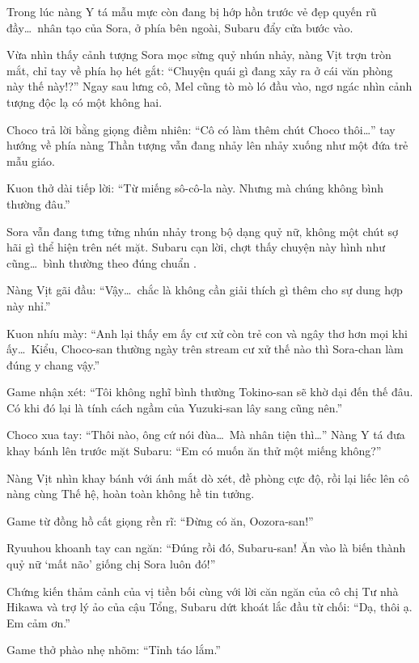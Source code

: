 \documentclass[../main.tex]{subfiles}
\begin{document}
Trong lúc nàng Y tá mẫu mực còn đang bị hớp hồn trước vẻ đẹp quyến rũ đầy\dots\ nhân tạo của Sora, ở phía bên ngoài, Subaru đẩy cửa bước vào.

Vừa nhìn thấy cảnh tượng Sora mọc sừng quỷ nhún nhảy, nàng Vịt trợn tròn mắt, chỉ tay về phía họ hét gắt: ``Chuyện quái gì đang xảy ra ở cái văn phòng này thế này!?'' Ngay sau lưng cô, Mel cũng tò mò ló đầu vào, ngơ ngác nhìn cảnh tượng độc lạ có một không hai.


Choco trả lời bằng giọng điềm nhiên: ``Cô có làm thêm chút Choco thôi\dots'' tay hướng về phía nàng Thần tượng vẫn đang nhảy lên nhảy xuống như một đứa trẻ mẫu giáo.

Kuon thở dài tiếp lời: ``Từ miếng sô-cô-la này. Nhưng mà chúng không bình thường đâu.''

Sora vẫn đang tưng tửng nhún nhảy trong bộ dạng quỷ nữ, không một chút sợ hãi gì thể hiện trên nét mặt. Subaru cạn lời, chợt thấy chuyện này hình như cũng\dots\ bình thường theo đúng chuẩn \hll.

Nàng Vịt gãi đầu: ``Vậy\dots\ chắc là không cần giải thích gì thêm cho sự dung hợp này nhỉ.''

Kuon nhíu mày: ``Anh lại thấy em ấy cư xử còn trẻ con và ngây thơ hơn mọi khi ấy\dots\ Kiểu, Choco-san thường ngày trên stream cư xử thế nào thì Sora-chan làm đúng y chang vậy.''

Game nhận xét: ``Tôi không nghĩ bình thường Tokino-san sẽ khờ dại đến thế đâu. Có khi đó lại là tính cách ngầm của Yuzuki-san lây sang cũng nên.''

Choco xua tay: ``Thôi nào, ông cứ nói đùa\dots\ Mà nhân tiện thì\dots'' Nàng Y tá đưa khay bánh lên trước mặt Subaru: ``Em có muốn ăn thử một miếng không?''

Nàng Vịt nhìn khay bánh với ánh mắt dò xét, đề phòng cực độ, rồi lại liếc lên cô nàng cùng Thế hệ, hoàn toàn không hề tin tưởng.


Game từ đồng hồ cất giọng rền rĩ: ``Đừng có ăn, Oozora-san!''

Ryuuhou khoanh tay can ngăn: ``Đúng rồi đó, Subaru-san! Ăn vào là biến thành quỷ nữ `mất não' giống chị Sora luôn đó!''

Chứng kiến thảm cảnh của vị tiền bối cùng với lời căn ngăn của cô chị Tư nhà Hikawa và trợ lý ảo của cậu Tổng, Subaru dứt khoát lắc đầu từ chối: ``Dạ, thôi ạ. Em cảm ơn.''

Game thở phào nhẹ nhõm: ``Tỉnh táo lắm.''
\end{document}
